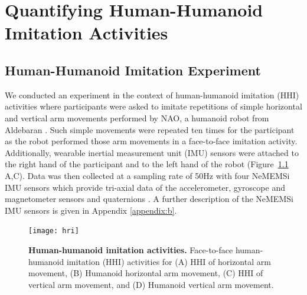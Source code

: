 
\chapter{Quantifying Human-Humanoid Imitation Activities} \label{chapter7}
%
\graphicspath{{figs/chapter7/PDF/}}


%
%


\section{Human-Humanoid Imitation Experiment} %
We conducted an experiment in the context of human-humanoid imitation (HHI) activities 
where participants were asked to imitate repetitions of simple horizontal 
and vertical arm movements performed by NAO, a humanoid robot from Aldebaran \cite{gouaillier2009}.
Such simple movements were repeated ten times for the participant as the 
robot performed those arm movements in a face-to-face imitation activity.
Additionally, wearable inertial measurement unit (IMU) sensors were attached 
to the right hand of the participant and to the left hand of the robot (Figure~\ref{fig:hri} A,C).
Data was then collected at a sampling rate of 50Hz with four NeMEMSi IMU sensors
which provide tri-axial data of the accelerometer, gyroscope and magnetometer sensors and
quaternions \cite{Comotti2014}. 
A further description of the NeMEMSi IMU sensors is given in Appendix \ref{appendix:b}.
\begin{figure}
  \centering
  \texttt{[image: hri]}
    \caption{
	{\bf Human-humanoid imitation activities.} 
		Face-to-face human-humanoid imitation (HHI) activities for 
		(A) HHI of horizontal arm movement, 
		(B) Humanoid horizontal arm movement,
		(C) HHI of vertical arm movement, and 
		(D) Humanoid vertical arm movement.
        }
    \label{fig:hri}
\end{figure}

